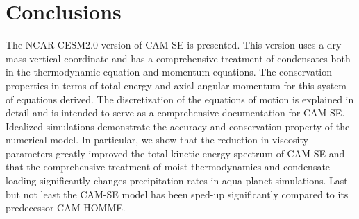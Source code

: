 \documentclass{agujournal}
\begin{document}
{\section{Conclusions}\label{sec:concl}
The NCAR CESM2.0 version of CAM-SE is presented. This version uses a dry-mass vertical coordinate and has a comprehensive treatment of condensates both in the thermodynamic equation and momentum equations. The conservation properties in terms of total energy and axial angular momentum for this system of equations derived. The discretization of the equations of motion is explained in detail and is intended to serve as a comprehensive documentation for CAM-SE. Idealized simulations demonstrate the accuracy and conservation property of the numerical model. In particular, we show that the reduction in viscosity parameters greatly improved the total kinetic energy spectrum of CAM-SE and that the comprehensive treatment of moist thermodynamics and condensate loading significantly changes precipitation rates in aqua-planet simulations. Last but not least the CAM-SE model has been sped-up significantly compared to its predecessor CAM-HOMME.





%
%
%
%
%
%
%
%

}
\end{document}
